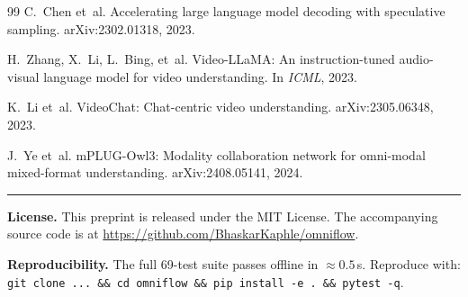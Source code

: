 \documentclass[11pt,a4paper]{article}
\begin{document}
\begin{thebibliography}{99}
C.~Chen et~al.
\newblock Accelerating large language model decoding with speculative sampling.
\newblock arXiv:2302.01318, 2023.

H.~Zhang, X.~Li, L.~Bing, et~al.
\newblock Video-LLaMA: An instruction-tuned audio-visual language model for video understanding.
\newblock In \emph{ICML}, 2023.

K.~Li et~al.
\newblock VideoChat: Chat-centric video understanding.
\newblock arXiv:2305.06348, 2023.

J.~Ye et~al.
\newblock mPLUG-Owl3: Modality collaboration network for omni-modal mixed-format understanding.
\newblock arXiv:2408.05141, 2024.

\end{thebibliography}

\bigskip
\hrule
\bigskip

\noindent\textbf{License.} This preprint is released under the MIT License.
The accompanying source code is at
\url{https://github.com/BhaskarKaphle/omniflow}.

\bigskip
\noindent\textbf{Reproducibility.} The full 69-test suite passes offline
in $\approx 0.5$\,s. Reproduce with:
\texttt{git clone ... \&\& cd omniflow \&\& pip install -e . \&\& pytest -q}.
\end{document}

